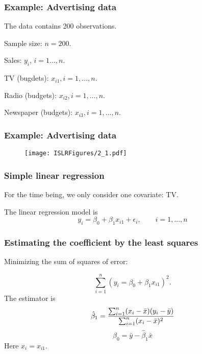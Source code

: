 \documentclass{beamer}
\begin{document}
      
      
      \begin{frame}
      	\frametitle{Example: Advertising data}
      	The data contains 200 observations.
      	
      	Sample size: $n=200$. 
      	
      	Sales: $y_i$, $i=1..., n$. 	
      	
      	TV (bugdets):  $x_{i1} ,  i=1,..., n$. 
      	
      	Radio (budgets):  $x_{i2} ,  i=1,..., n$. 
      	
      	Newspaper (budgets): $x_{i3} ,  i=1,..., n$. 
      	
      
      \end{frame}
      
      
      \begin{frame}
      	\frametitle{Example: Advertising data}
      	
      	\begin{figure}[h]
      		\centering
      		\texttt{[image: ISLRFigures/2\_1.pdf]}	 
      	\end{figure}	
      \end{frame}
      
        \begin{frame}
        	\frametitle{Simple linear regression}
        	
        	For the time being, we only consider one covariate: TV. 
        	
        	The linear regression model is 
        		$$y_i = \beta_0 + \beta_1 x_{i1} +  \epsilon_i, \qquad i=1,..., n  $$
        	
        \end{frame}
        
          \begin{frame}
          	\frametitle{Estimating the coefficient by the least squares}
          	
           
          	Minimizing the sum of squares of error:
          	 
          	$$\sum_{i=1}^n (y_i = \beta_0 + \beta_1 x_{i1})^2.  $$
          	The estimator is 
          	$$ \hat \beta_1 = { \sum_{i=1}^n (x_i - \bar x)(y_i - \bar y) 
          		\over \sum_{i=1}^n (x_i - \bar x)^2}$$
          	$$ \hat \beta_0 = \bar y - \hat \beta_1 \bar x$$
          	Here $x_i = x_{i1}$.
          	
          	
          \end{frame}
          
\end{document}
